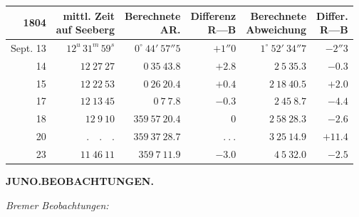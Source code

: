 \begin{center}
\begingroup\fontsize{8}{10}\selectfont\setlength{\tabcolsep}{3pt}\renewcommand{\arraystretch}{1.12}
\begin{tabular}{r|r|r|r|r|r}
1804 & \shortstack{mittl. Zeit\\auf Seeberg} & \shortstack{Berechnete\\AR.} & \shortstack{Differenz\\R—B} & \shortstack{Berechnete\\Abweichung} & \shortstack{Differ.\\R—B} \\ \hline
Sept. 13 & $12^{u}\,31^{m}\,59^{s}$ & $0^\circ\ 44'\ 57''5$ & $+1''0$ & $1^\circ\ 52'\ 34''7$ & $-2''3$ \\
14 & $12\ 27\ 27$ & $0\ 35\ 43.8$ & $+2.8$ & $2\ 5\ 35.3$ & $-0.3$ \\
15 & $12\ 22\ 53$ & $0\ 26\ 20.4$ & $+0.4$ & $2\ 18\ 40.5$ & $+2.0$ \\
17 & $12\ 13\ 45$ & $0\ 7\ 7.8$ & $-0.3$ & $2\ 45\ 8.7$ & $-4.4$ \\
18 & $12\ 9\ 10$ & $359\ 57\ 20.4$ & $0$ & $2\ 58\ 28.3$ & $-2.6$ \\
20 & $ .\quad .\quad . $ & $359\ 37\ 28.7$ & $ .\ .\ . $ & $3\ 25\ 14.9$ & $+11.4$ \\
23 & $11\ 46\ 11$ & $359\ 7\ 11.9$ & $-3.0$ & $4\ 5\ 32.0$ & $-2.5$ \\
\end{tabular}\endgroup
\end{center}
\clearpage
\thispagestyle{empty}
\noindent{}%
%
\parbox[t]{\dimexpr\linewidth-24mm\relax}{\centering\footnotesize\bfseries JUNO.\enspace BEOBACHTUNGEN.\par}%
\makebox[12mm][r]{}\par\nobreak\medskip
\begin{center}
\textit{Bremer Beobachtungen:}
\end{center}


